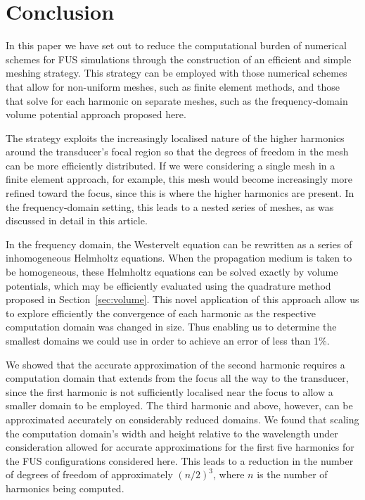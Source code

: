 \documentclass[preprint]{JASA}
\newcommand{\red}[1]{{\color{red} #1}}
\begin{document}
\section{\label{sec:conclusion}Conclusion}
In this paper we have set out to reduce the computational burden of numerical 
schemes for \red{FUS} simulations through the construction of an efficient and simple 
meshing strategy. This strategy can be employed with those numerical schemes that 
allow for non-uniform meshes, such as finite element methods, and those that solve 
for each harmonic on separate meshes, such as the frequency-domain volume potential 
approach proposed here.

The strategy exploits the increasingly localised nature of the higher harmonics 
around the transducer's focal region so that the degrees of freedom in the mesh
can be more efficiently distributed. If we were considering a single mesh in a 
finite element approach, for example, this mesh would become increasingly more 
refined toward the focus, since this is where the higher harmonics are present.
In the frequency-domain setting, this leads to a nested series of meshes, as 
was discussed in detail in this article.

In the frequency domain, the Westervelt equation can be rewritten as a series 
of inhomogeneous Helmholtz equations. When the propagation medium is taken to be 
homogeneous, these Helmholtz equations can be solved exactly by volume potentials, 
which may be efficiently evaluated using the quadrature method proposed in 
Section~\ref{sec:volume}. This novel application of this approach allow us to 
explore efficiently the convergence of each harmonic as the respective computation 
domain was changed in size. Thus enabling us to determine the smallest domains 
we could use in order to achieve an error of less than 1\%.

We showed that the accurate approximation of the second harmonic requires a 
computation domain that extends from the focus all the way to the transducer, since 
the first harmonic is not sufficiently localised near the focus to allow a 
smaller domain to be employed. The third harmonic and above, however, can be 
approximated accurately on considerably reduced domains. We found that 
scaling the computation domain's width and height relative to the wavelength 
under consideration allowed for accurate approximations for the first five 
harmonics for the \red{FUS} configurations considered here. This leads to a reduction 
in the number of degrees of freedom of approximately $(n/2)^3$, where $n$ is 
the number of harmonics being computed.
\end{document}
